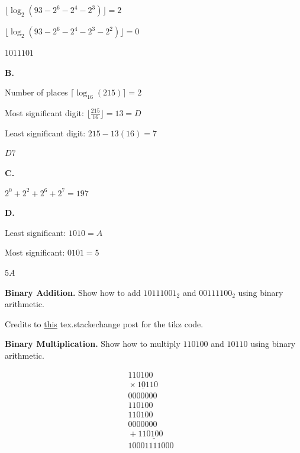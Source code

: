 \documentclass{exam}
\newcommand{\addend}{\text{\textsl{\color{gray}{Addend}}}}
\newcommand{\augend}{\text{\textsl{\color{gray}{Augend}}}}
\newcommand{\sumOut}{\text{\textsl{\color{gray}{Sum}}}}
\begin{document}
\begin{questions}
$\lfloor \log_{2}(93-2^6-2^4-2^3) \rfloor = 2$

$\lfloor \log_{2}(93-2^6-2^4-2^3-2^2) \rfloor = 0$


$1011101$

\textbf{B.}

Number of places $\lceil \log_{16}(215)\rceil=2$

Most significant digit: $\lfloor \frac{215}{16} \rfloor = 13=D$

Least significant digit: $215-13(16)=7$

$D7$

\textbf{C.}

$2^{0}+2^{2}+2^{6}+2^{7}=197$


\textbf{D.} 

Least significant: $1010=A$

Most significant: $0101=5$

$5A$ 

\question[4]
\textbf{Binary Addition.}
Show how to add $10111001_{2}$ and $00111100_{2}$ using binary arithmetic. 


Credits to \href{https://tex.stackexchange.com/a/96764}{this} tex.stackechange post for the tikz code.

\question[4]
\textbf{Binary Multiplication.}
Show how to multiply $110100$ and $10110$ using binary arithmetic. 

\begin{equation}
\begin{array}{r}
                         110100\\
\underline{\mbox{}\times 10110}\\
                         0000000\\
                        110100\phantom{0}\\
                       110100\phantom{00}\\
                       0000000\phantom{000}\\
  \underline{\mbox{}+ 110100\phantom{0000}}\\
                     10001111000
\end{array}
\end{equation}



\end{questions}
\end{document}
